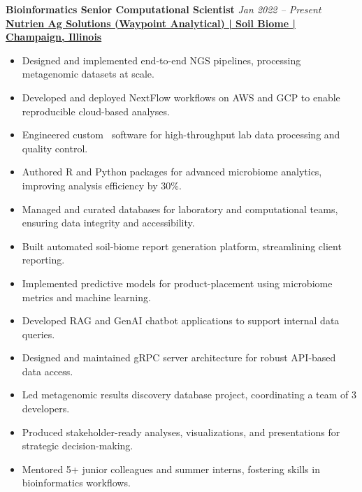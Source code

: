 

\newcommand{\JobTitle}[1]{\textbf{#1}}
\newcommand{\Company}[1]{\textit{#1}}
\newcommand{\JobDates}[1]{\hfill\textit{#1}}
\newcommand{\JobEntry}[3]{%
  \JobTitle{#1} \JobDates{#3}\\
  \Company{#2}\\
}

\newcommand{\Job}[5]{%
  \noindent\textbf{#1} \hfill \textit{#4}\\
  \textbf{\href{#2}{#3}}\\
  \begin{addmargin}[1cm]{2cm}
    #5
  \end{addmargin}
  \sectionvspace
}
\newcommand{\JobItem}[1]{\item #1}


\Job
  {Bioinformatics Senior Computational Scientist}
  {https://nutrienagsolutions.com/}
  {Nutrien Ag Solutions (Waypoint Analytical) | Soil Biome | Champaign, Illinois}
  {Jan 2022 – Present}
  {
    \begin{itemize}[left=-0.2cm, itemsep=-0.15cm]
      \JobItem{Designed and implemented end-to-end NGS pipelines, processing metagenomic datasets at scale.}
      \JobItem{Developed and deployed NextFlow workflows on AWS and GCP to enable reproducible cloud-based analyses.}
      \JobItem{Engineered custom \CC\ software for high-throughput lab data processing and quality control.}
      \JobItem{Authored R and Python packages for advanced microbiome analytics, improving analysis efficiency by 30\%.}
      \JobItem{Managed and curated databases for laboratory and computational teams, ensuring data integrity and accessibility.}
      \JobItem{Built automated soil-biome report generation platform, streamlining client reporting.}
      \JobItem{Implemented predictive models for product-placement using microbiome metrics and machine learning.}
      \JobItem{Developed RAG and GenAI chatbot applications to support internal data queries.}
      \JobItem{Designed and maintained gRPC server architecture for robust API-based data access.}
      \JobItem{Led metagenomic results discovery database project, coordinating a team of 3 developers.}
      \JobItem{Produced stakeholder-ready analyses, visualizations, and presentations for strategic decision-making.}
      \JobItem{Mentored 5+ junior colleagues and summer interns, fostering skills in bioinformatics workflows.}
    \end{itemize}
  }

